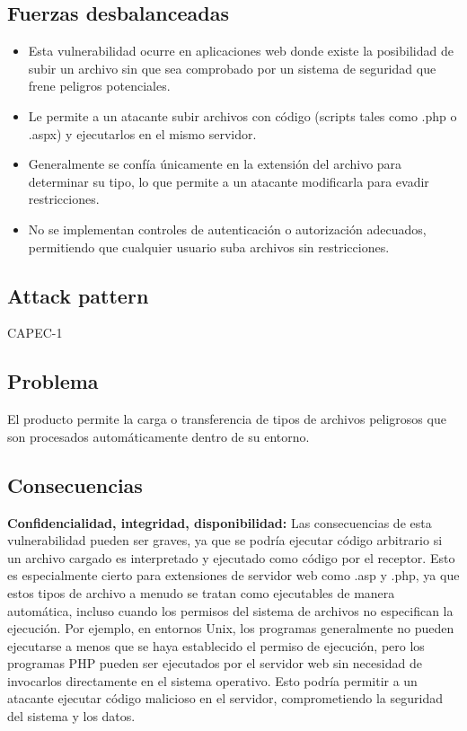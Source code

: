 \subsection*{Fuerzas desbalanceadas}
\begin{itemize}
    \item Esta vulnerabilidad ocurre en aplicaciones web donde existe la posibilidad de subir un archivo sin que sea comprobado por un sistema de seguridad que frene peligros potenciales.
    \item Le permite a un atacante subir archivos con código (scripts tales como .php o .aspx) y ejecutarlos en el mismo servidor.
    \item Generalmente se confía únicamente en la extensión del archivo para determinar su tipo, lo que permite a un atacante modificarla para evadir restricciones.
    \item No se implementan controles de autenticación o autorización adecuados, permitiendo que cualquier usuario suba archivos sin restricciones.
\end{itemize}

\subsection*{Attack pattern}
CAPEC-1
\subsection*{Problema}
El producto permite la carga o transferencia de tipos de archivos peligrosos que son procesados automáticamente dentro de su entorno.
\subsection*{Consecuencias}
\textbf{Confidencialidad, integridad, disponibilidad:} Las consecuencias de esta vulnerabilidad pueden ser graves, ya que se podría ejecutar código arbitrario si un archivo cargado es interpretado y ejecutado como código por el receptor. Esto es especialmente cierto para extensiones de servidor web como .asp y .php, ya que estos tipos de archivo a menudo se tratan como ejecutables de manera automática, incluso cuando los permisos del sistema de archivos no especifican la ejecución. Por ejemplo, en entornos Unix, los programas generalmente no pueden ejecutarse a menos que se haya establecido el permiso de ejecución, pero los programas PHP pueden ser ejecutados por el servidor web sin necesidad de invocarlos directamente en el sistema operativo. Esto podría permitir a un atacante ejecutar código malicioso en el servidor, comprometiendo la seguridad del sistema y los datos.
